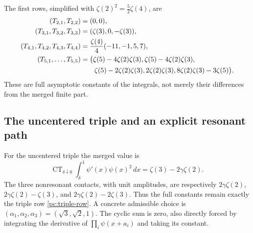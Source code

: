 The first rows, simplified with $\zeta(2)^2=\tfrac52\zeta(4)$, are
\begin{align}
 (T_{2,1},T_{2,2})&=(0,0),\\
 (T_{3,1},T_{3,2},T_{3,3})&=(\zeta(3),0,-\zeta(3)),
                                                  \label{pc:triple-row}\\
 (T_{4,1},T_{4,2},T_{4,3},T_{4,4})
   &=\frac{\zeta(4)}4(-11,-1,5,7),
                                                  \label{pc:fourth-row}\\
 (T_{5,1},\ldots,T_{5,5})
   &=\bigl(\zeta(5)-4\zeta(2)\zeta(3),
            \zeta(5)-4\zeta(2)\zeta(3),\notag\\
   &\qquad\zeta(5)-2\zeta(2)\zeta(3),
            2\zeta(2)\zeta(3),
            8\zeta(2)\zeta(3)-3\zeta(5)\bigr).
                                                  \label{pc:fifth-row}
\end{align}
These are full asymptotic constants of the integrals, not merely their
differences from the merged finite part.

\subsection{The uncentered triple and an explicit resonant path}

For the uncentered triple the merged value is
\begin{equation}\label{pc:triple-baseline}
 \operatorname{CT}_{\delta\downarrow0}
       \int_\delta^1\psi'(x)\psi(x)^2\,dx
           =\zeta(3)-2\gamma\zeta(2).
\end{equation}
The three nonresonant contacts, with unit amplitudes, are respectively
$2\gamma\zeta(2)$,
$2\gamma\zeta(2)-\zeta(3)$, and
$2\gamma\zeta(2)-2\zeta(3)$.  Thus the full constants remain
exactly the triple row \eqref{pc:triple-row}.  A concrete admissible
choice is $(\alpha_1,\alpha_2,\alpha_3)=(\sqrt3,\sqrt2,1)$.
The cyclic sum is zero, also directly forced by integrating the
derivative of $\prod_i\psi(x+a_i)$ and taking its constant.

